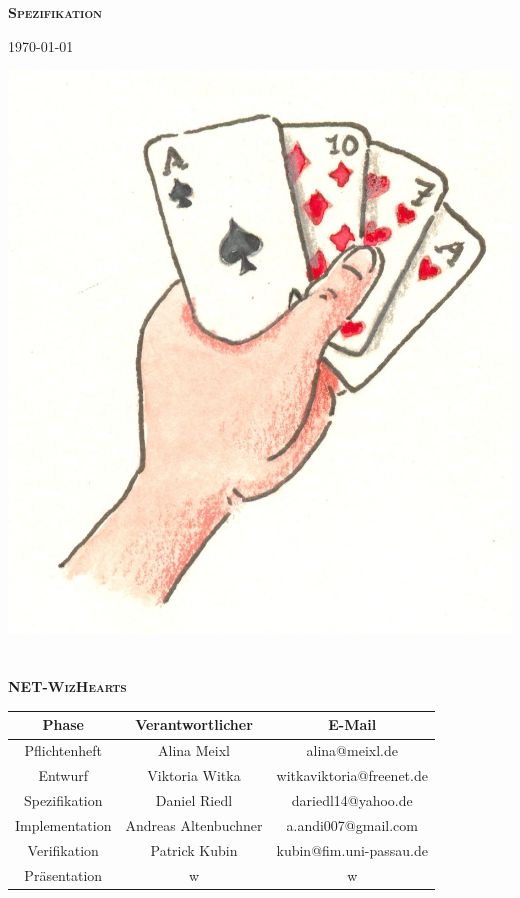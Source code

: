 \documentclass[twoside]{article}
\begin{document}
\hypersetup{pageanchor=false}
\begin{titlepage}
\vspace*{2cm}
\begin{center}%
\textbf{\textsc{\LARGE Spezifikation}}

{\large \today}

\vspace{2cm}
\includegraphics{kartenspiel}
\ \\
\ \\

\textbf{\textsc{\LARGE NET-WizHearts}}
\vspace{2cm}

\begin{tabular}{|c|c|c|}\hline
   Phase & Verantwortlicher & E-Mail \\ \hline\hline
   Pflichtenheft & Alina Meixl &  alina@meixl.de \\ \hline
   Entwurf & Viktoria Witka & witkaviktoria@freenet.de \\ \hline
   Spezifikation & Daniel Riedl & dariedl14@yahoo.de \\ \hline
   Implementation & Andreas Altenbuchner& a.andi007@gmail.com\\ \hline
   Verifikation & Patrick Kubin & kubin@fim.uni-passau.de\\ \hline
   Präsentation & w& w\\ \hline
 \end{tabular}
\end{center}
\end{titlepage}
\tableofcontents
{}
\hypersetup{pageanchor=true}
\end{document}
